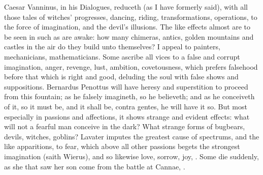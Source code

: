 {{Caesar Vanninus, in his Dialogues, \etc{} reduceth (as I have formerly
said), with all those tales of witches' progresses, dancing, riding,
transformations, operations, \etc{} to the force of  imagination,
and the devil's illusions. The like effects almost are to be seen
in such as are awake: how many chimeras, antics, golden mountains and
castles in the air do they build unto themselves? I appeal to painters,
mechanicians, mathematicians. Some ascribe all vices to a false and
corrupt imagination, anger, revenge, lust, ambition, covetousness,
which prefers falsehood before that which is right and good, deluding
the soul with false shows and suppositions. Bernardus Penottus
will have heresy and superstition to proceed from this fountain; as he
falsely imagineth, so he believeth; and as he conceiveth of it, so it
must be, and it shall be, contra gentes, he will have it so. But most
especially in passions and affections, it shows strange and evident
effects: what will not a fearful man conceive in the dark? What strange
forms of bugbears, devils, witches, goblins? Lavater imputes the
greatest cause of spectrums, and the like apparitions, to fear, which
above all other passions begets the strongest imagination (saith
Wierus), and so likewise love, sorrow, joy, \etc{}. Some die
suddenly, as she that saw her son come from the battle at Cannae, \etc{}.

}}
